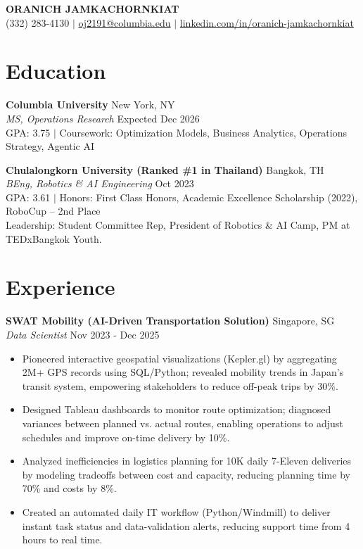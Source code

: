 \documentclass[a4paper,10pt]{article}
\begin{document}
\begin{center}
    {\Huge \textbf{ORANICH JAMKACHORNKIAT}} \\ \vspace{4pt}
    (332) 283-4130 $|$ \href{mailto:oj2191@columbia.edu}{oj2191@columbia.edu} $|$ \href{https://linkedin.com/in/oranich-jamkachornkiat}{linkedin.com/in/oranich-jamkachornkiat}
\end{center}

\vspace{5pt}

\section{Education}
\noindent \textbf{Columbia University} \hfill New York, NY \\
\textit{MS, Operations Research} \hfill Expected Dec 2026 \\
GPA: 3.75 $|$ Coursework: Optimization Models, Business Analytics, Operations Strategy, Agentic AI

\vspace{6pt}

\noindent \textbf{Chulalongkorn University (Ranked \#1 in Thailand)} \hfill Bangkok, TH \\
\textit{BEng, Robotics \& AI Engineering} \hfill Oct 2023 \\
GPA: 3.61 $|$ Honors: First Class Honors, Academic Excellence Scholarship (2022), RoboCup – 2nd Place \\
Leadership: Student Committee Rep, President of Robotics \& AI Camp, PM at TEDxBangkok Youth.

\section{Experience}
\noindent \textbf{SWAT Mobility (AI-Driven Transportation Solution)} \hfill Singapore, SG \\
\textit{Data Scientist} \hfill Nov 2023 - Dec 2025
\begin{itemize}
    \item Pioneered interactive geospatial visualizations (Kepler.gl) by aggregating 2M+ GPS records using SQL/Python; revealed mobility trends in Japan’s transit system, empowering stakeholders to reduce off-peak trips by 30\%.
    \item Designed Tableau dashboards to monitor route optimization; diagnosed variances between planned vs. actual routes, enabling operations to adjust schedules and improve on-time delivery by 10\%.
    \item Analyzed inefficiencies in logistics planning for 10K daily 7-Eleven deliveries by modeling tradeoffs between cost and capacity, reducing planning time by 70\% and costs by 8\%.
    \item Created an automated daily IT workflow (Python/Windmill) to deliver instant task status and data-validation alerts, reducing support time from 4 hours to real time.
\end{itemize}
\end{document}

